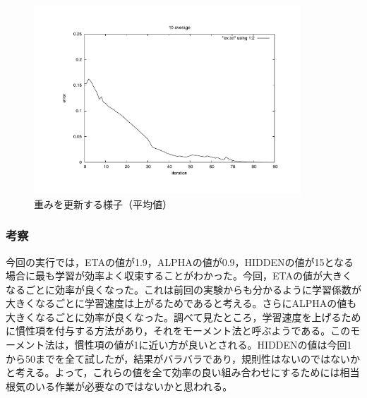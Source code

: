 \begin{figure}[h]
 \begin{center}
  \includegraphics[width=10.0cm,angle=-90]{figs/level2/ave1.pdf}
  \caption{重みを更新する様子（平均値）}
  \label{fig:level2}
 \end{center}
\end{figure}


\subsubsection{考察}
今回の実行では，ETAの値が1.9，ALPHAの値が0.9，HIDDENの値が15となる場合に最も学習が効率よく収束することがわかった。今回，ETAの値が大きくなるごとに効率が良くなった。これは前回の実験からも分かるように学習係数が大きくなるごとに学習速度は上がるためであると考える。さらにALPHAの値も大きくなるごとに効率が良くなった。調べて見たところ，学習速度を上げるために慣性項を付与する方法があり，それをモーメント法と呼ぶようである。このモーメント法は，慣性項の値が1に近い方が良いとされる。HIDDENの値は今回1から50までを全て試したが，結果がバラバラであり，規則性はないのではないかと考える。よって，これらの値を全て効率の良い組み合わせにするためには相当根気のいる作業が必要なのではないかと思われる。

